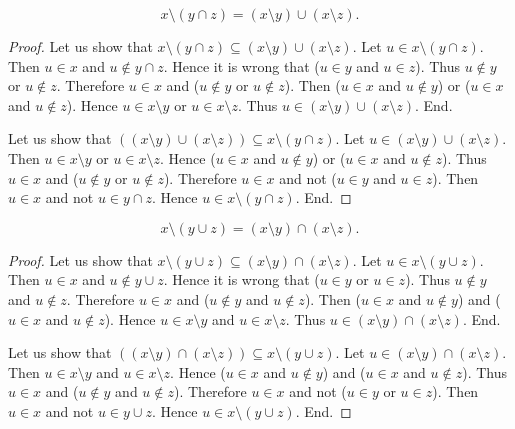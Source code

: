 \documentclass[../../set-theory.tex]{subfiles}
\begin{document}
  \begin{forthel}
    \begin{proposition}\label{SetTheory_01_01_339365}
      \[ x \setminus (y \cap z) = (x \setminus y) \cup (x \setminus z). \]
    \end{proposition}
    \begin{proof}
      Let us show that $x \setminus (y \cap z) \subseteq (x \setminus y) \cup (x \setminus z)$.
        Let $u \in x \setminus (y \cap z)$.
        Then $u \in x$ and $u \notin y \cap z$.
        Hence it is wrong that ($u \in y$ and $u \in z$).
        Thus $u \notin y$ or $u \notin z$.
        Therefore $u \in x$ and ($u \notin y$ or $u \notin z$).
        Then ($u \in x$ and $u \notin y$) or ($u \in x$ and $u \notin z$).
        Hence $u \in x \setminus y$ or $u \in x \setminus z$.
        Thus $u \in (x \setminus y) \cup (x \setminus z)$.
      End.

      Let us show that $((x \setminus y) \cup (x \setminus z)) \subseteq x \setminus (y \cap z)$.
        Let $u \in (x \setminus y) \cup (x \setminus z)$.
        Then $u \in x \setminus y$ or $u \in x \setminus z$.
        Hence ($u \in x$ and $u \notin y$) or ($u \in x$ and $u \notin z$).
        Thus $u \in x$ and ($u \notin y$ or $u \notin z$).
        Therefore $u \in x$ and not ($u \in y$ and $u \in z$).
        Then $u \in x$ and not $u \in y \cap z$.
        Hence $u \in x \setminus (y \cap z)$.
      End.
    \end{proof}

    \begin{proposition}\label{SetTheory_01_01_403962}
      \[ x \setminus (y \cup z) = (x \setminus y) \cap (x \setminus z). \]
    \end{proposition}
    \begin{proof}
      Let us show that $x \setminus (y \cup z) \subseteq (x \setminus y) \cap (x \setminus z)$.
        Let $u \in x \setminus (y \cup z)$.
        Then $u \in x$ and $u \notin y \cup z$.
        Hence it is wrong that ($u \in y$ or $u \in z$).
        Thus $u \notin y$ and $u \notin z$.
        Therefore $u \in x$ and ($u \notin y$ and $u \notin z$).
        Then ($u \in x$ and $u \notin y$) and ($u \in x$ and $u \notin z$).
        Hence $u \in x \setminus y$ and $u \in x \setminus z$.
        Thus $u \in (x \setminus y) \cap (x \setminus z)$.
      End.

      Let us show that $((x \setminus y) \cap (x \setminus z)) \subseteq x \setminus (y \cup z)$.
        Let $u \in (x \setminus y) \cap (x \setminus z)$.
        Then $u \in x \setminus y$ and $u \in x \setminus z$.
        Hence ($u \in x$ and $u \notin y$) and ($u \in x$ and $u \notin z$).
        Thus $u \in x$ and ($u \notin y$ and $u \notin z$).
        Therefore $u \in x$ and not ($u \in y$ or $u \in z$).
        Then $u \in x$ and not $u \in y \cup z$.
        Hence $u \in x \setminus (y \cup z)$.
      End.
    \end{proof}
  \end{forthel}
\end{document}
